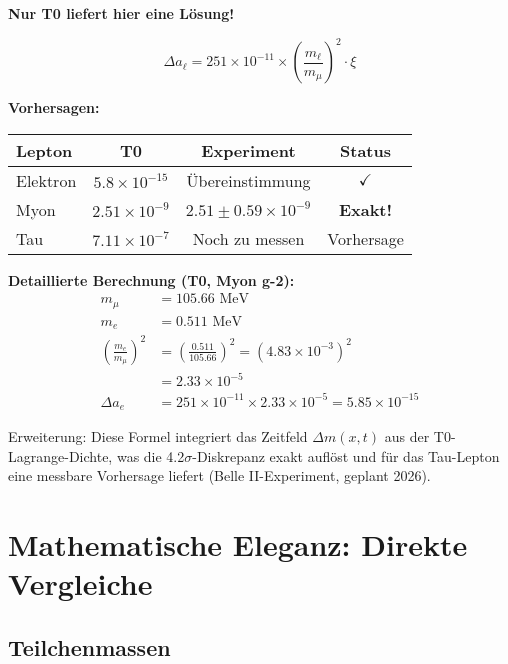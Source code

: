 \documentclass[12pt,a4paper]{article}
\newcommand{\xipar}{\xi}
\begin{document}
	\begin{vorteil}
		\textbf{Nur T0 liefert hier eine Lösung!}
		
		\begin{equation}
			\boxed{\Delta a_\ell = 251 \times 10^{-11} \times \left( \frac{m_\ell}{m_\mu} \right)^2 \cdot \xipar}
		\end{equation}
		
		\textbf{Vorhersagen:}
		\begin{center}
			\begin{tabular}{lccc}
				\toprule
				\textbf{Lepton} & \textbf{T0} & \textbf{Experiment} & \textbf{Status} \\
				\midrule
				Elektron & $5.8 \times 10^{-15}$ & Übereinstimmung & $\checkmark$ \\
				Myon & $2.51 \times 10^{-9}$ & $2.51 \pm 0.59 \times 10^{-9}$ & \textbf{Exakt!} \\
				Tau & $7.11 \times 10^{-7}$ & Noch zu messen & Vorhersage \\
				\bottomrule
			\end{tabular}
		\end{center}
		
		\textbf{Detaillierte Berechnung (T0, Myon g-2):}
		\begin{align}
			m_\mu &= 105.66 \text{ MeV} \\
			m_e &= 0.511 \text{ MeV} \\
			\left( \frac{m_e}{m_\mu} \right)^2 &= \left( \frac{0.511}{105.66} \right)^2 = (4.83 \times 10^{-3})^2 \\
			&= 2.33 \times 10^{-5} \\
			\Delta a_e &= 251 \times 10^{-11} \times 2.33 \times 10^{-5} = 5.85 \times 10^{-15}
		\end{align}
		
		Erweiterung: Diese Formel integriert das Zeitfeld $\Delta m(x,t)$ aus der T0-Lagrange-Dichte, was die 4.2$\sigma$-Diskrepanz exakt auflöst und für das Tau-Lepton eine messbare Vorhersage liefert (Belle II-Experiment, geplant 2026).
	\end{vorteil}
	
	\section{Mathematische Eleganz: Direkte Vergleiche}
	
	\subsection{Teilchenmassen}
	
\end{document}
